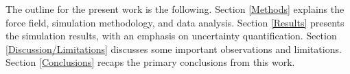 \documentclass[preprint,review,12pt]{elsarticle}
\begin{document}
	
	
	
	The outline for the present work is the following. Section \ref{Methods} explains the force field, simulation methodology, and data analysis. Section \ref{Results} presents the simulation results, with an emphasis on uncertainty quantification. Section \ref{Discussion/Limitations} discusses some important observations and limitations. Section \ref{Conclusions} recaps the primary conclusions from this work.
	
%	
%	
\end{document}
